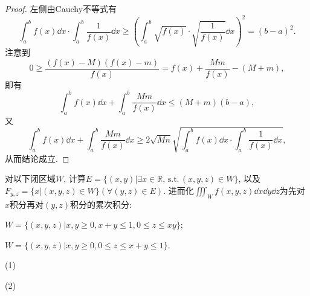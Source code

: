 \begin{quiza}
\begin{proof}
左侧由Cauchy不等式有\[\int_{a}^{b}f(x)\dd x\cdot\int_{a}^{b}\frac{1}{f(x)}\dd x\geqslant\left(\int_{a}^{b}\sqrt{f(x)}\cdot\sqrt{\frac{1}{f(x)}}\dd x\right)^2=(b-a)^2.\]注意到\[0\geqslant\frac{\left(f(x)-M\right)\left(f(x)-m\right)}{f(x)}=f(x)+\frac{Mm}{f(x)}-(M+m),\]即有\[\int_{a}^{b}f(x)\dd x+\int_{a}^{b}\frac{Mm}{f(x)}\dd x\leqslant (M+m)(b-a),\]又\[\int_{a}^{b}f(x)\dd x+\int_{a}^{b}\frac{Mm}{f(x)}\dd x\geqslant 2\sqrt{Mn}\sqrt{\int_{a}^{b}f(x)\dd x\cdot\int_{a}^{b}\frac{1}{f(x)}\dd x},\]从而结论成立.
\end{proof}
\woe 对以下闭区域\(W\), 计算\(E=\{(x,y)\big|\exists x\in\mathbb{R},\,\mathrm{s.t.}\,(x,y,z)\in W\}\), 以及\(F_{y,z}=\{x\big|(x,y,z)\in W\}(\forall(y,z)\in E)\). 进而化\(\iiint_Wf(x,y,z)\dd x\dd y\dd z\)为先对\(x\)积分再对\((y,z)\)积分的累次积分:\begin{compactenum}[(1)]
    \item \(W=\{(x,y,z)\big|x,y\geqslant 0,x+y\leqslant 1,0\leqslant z\leqslant xy\}\);
    \item \(W=\{(x,y,z)\big|x,y\geqslant 0,0\leqslant z\leqslant x+y\leqslant 1\}\).
    \end{compactenum}
\begin{solution}
(1)

(2)
\end{solution}
\end{quiza}
